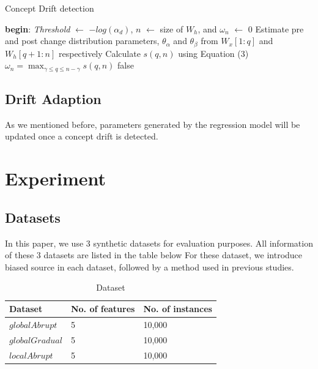 \begin{algorithm}
\caption{Concept Drift detection}\label{driftdetection}
\begin{algorithmic}[1]
\BState \textbf{begin}:
\State \textit{Threshold} $\gets$ $-log({\alpha}_d)$, $n$ $\gets$ size of $W_h$, and $\omega_n$ $\gets$ 0
\State Estimate pre and post change distribution 
\State parameters, $\theta_{\alpha}$ and $\theta_{\beta}$ from $W_x[1:q]$ and 
\State $W_h[q+1:n]$ respectively
\State Calculate $s(q,n)$ using Equation (3)
\EndFor
\State $\omega_{n} = \max_{\gamma \leq q \leq n-\gamma}s(q,n)$
\State \Return false
\Else
\State {}
\EndIf
\Else
\State {}
\EndIf
\EndProcedure
\end{algorithmic}
\end{algorithm}
        

\subsection{Drift Adaption}
\label{driftadaption}
As we mentioned before, parameters generated by the regression
model will be updated once a concept drift is detected. 

\section{Experiment}
\subsection{Datasets}
In this paper, we use 3 synthetic datasets for evaluation
purposes. All information of these 3 datasets are listed in the table below
For these dataset, we introduce biased source in each dataset, followed by a method used in previous studies.

\begin{table}[H]
\centering
\caption{Dataset}
\label{tab2}
\begin{tabular}{|l|l|l|}
\hline
 \bf{Dataset} & \bf{No. of features} & \bf{No. of instances} \\ \hline
 $globalAbrupt$ & 5 & 10,000\\ \hline
 $globalGradual$ & 5 & 10,000\\ \hline
 $localAbrupt$ & 5 & 10,000\\ \hline
\end{tabular}
\end{table}



